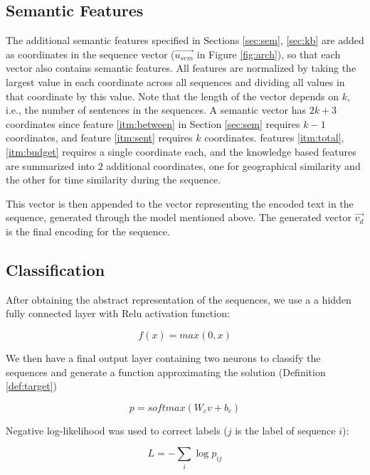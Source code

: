 \subsection{Semantic Features}
The additional semantic features specified 
in Sections \ref{sec:sem}, \ref{sec:kb} 
are added as coordinates in the sequence vector ($\vec{u_{sem}}$ in Figure \ref{fig:arch}), so that 
each vector also contains semantic features. 
All features are normalized by taking the largest 
value in each coordinate across all sequences and dividing 
all values in that coordinate by this value.  
Note that the length of the vector depends on $k$, 
i.e., the number of sentences in the sequences. 
A semantic vector has $2k+3$ coordinates since feature \ref{itm:between} in Section \ref{sec:sem} requires $k-1$ coordinates, and 
feature \ref{itm:sent} requires $k$ coordinates. 
features \ref{itm:total}, \ref{itm:budget} requires a single coordinate each, 
and the knowledge based features are summarized into $2$ additional coordinates, 
one for geographical similarity and the other for time similarity during the sequence. 

This vector is then appended to the vector representing the encoded text in the sequence, 
generated through the model mentioned above. 
The generated vector $\vec{v_d}$ is the final encoding for the sequence.


\subsection{Classification}
After obtaining the abstract representation of the sequences, 
we use a a hidden fully connected layer with Relu activation function: 

\begin{equation*}
	f(x) = max(0, x)
\end{equation*}


We then have a final output layer containing two neurons to classify the sequences and 
generate a function approximating the solution (Definition \ref{def:target}) 

\begin{equation*}
	p = softmax(W_c v + b_c)
\end{equation*}

Negative log-likelihood was used to correct labels ($j$ is the label of sequence $i$): 

\begin{equation*}
	L = - \sum_{i} \log{p_{ij}}
\end{equation*}

